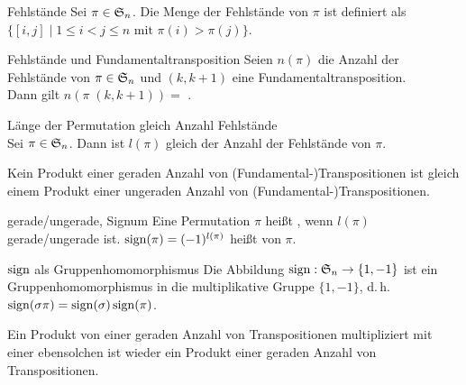 \begin{Def}{Fehlstände}
    Sei $\pi \in \mathfrak{S}_n$.
    Die Menge der Fehlstände von $\pi$ ist definiert als \\
    $\{[i,j] \;|\; 1 \le i < j \le n \text{ mit } \pi(i) > \pi(j)\}$.
\end{Def}

\begin{Lemma}{Fehlstände und Fundamentaltransposition}
    Seien $n(\pi)$ die Anzahl der Fehlstände von $\pi \in \mathfrak{S}_n$
    und $(k, k + 1)$ eine Fundamentaltransposition. \\
    Dann gilt $n(\pi \; (k, k + 1)) =$
    .
\end{Lemma}

\begin{Satz}{Länge der Permutation gleich Anzahl Fehlstände} \\
    Sei $\pi \in \mathfrak{S}_n$.
    Dann ist $l(\pi)$ gleich der Anzahl der Fehlstände von $\pi$.
\end{Satz}

\begin{Kor}
    Kein Produkt einer geraden Anzahl von (Fundamental-)Transpositionen
    ist gleich einem Produkt einer ungeraden Anzahl von
    (Fundamental-)Transpositionen.
\end{Kor}

\begin{Def}{gerade/ungerade, Signum}
    Eine Permutation $\pi$ heißt , wenn
    $l(\pi)$ gerade/ungerade ist.
    $\operatorname{sign}(\pi) = (-1)^{l(\pi)}$ heißt  von $\pi$.
\end{Def}

\begin{Lemma}{$\operatorname{sign}$ als Gruppenhomomorphismus}
    Die Abbildung $\operatorname{sign}: \mathfrak{S}_n \rightarrow \{1, -1\}$ ist ein
    Gruppenhomomorphismus in die multiplikative Gruppe $\{1, -1\}$,
    d.\,h. $\operatorname{sign}(\sigma \pi) = \operatorname{sign}(\sigma) \operatorname{sign}(\pi)$.
\end{Lemma}

\begin{Kor}
    Ein Produkt von einer geraden Anzahl von Transpositionen multipliziert mit
    einer ebensolchen ist wieder ein
    Produkt einer geraden Anzahl von Transpositionen.
\end{Kor}

